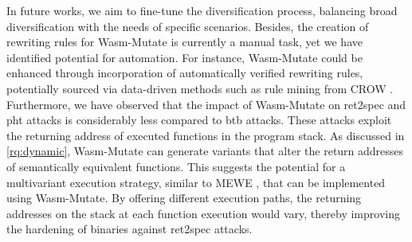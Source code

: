 \documentclass[sigplan,screen]{acmart}
\newcommand{\tool}{{\sc Wasm-Mutate}\xspace}
\begin{document}
In future works, we aim to fine-tune the diversification process, balancing broad diversification with the needs of specific scenarios. 
Besides, the creation of rewriting rules for \tool is currently a manual task, yet we have identified potential for automation. 
For instance, \tool could be enhanced through incorporation of automatically verified rewriting rules, potentially sourced via data-driven methods such as rule mining from CROW \cite{10026577}.
Furthermore, we have observed that the impact of \tool on ret2spec and pht attacks is considerably less compared to btb attacks. 
These attacks exploit the returning address of executed functions in the program stack. 
As discussed in \ref{rq:dynamic}, \tool can generate variants that alter the return addresses of semantically equivalent functions. 
This suggests the potential for a multivariant execution strategy, similar to MEWE \cite{MEWE}, that can be implemented using \tool. 
By offering different execution paths, the returning addresses on the stack at each function execution would vary, thereby improving the hardening of binaries against ret2spec attacks.




\end{document}
